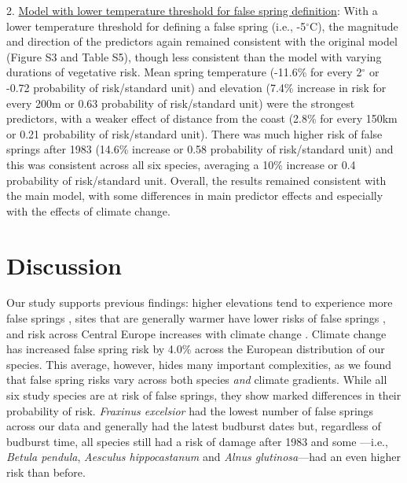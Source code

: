 \documentclass{article}\usepackage[]{graphicx}\usepackage[]{color}
\begin{document}
2. \underline{Model with lower temperature threshold for false spring definition}: With a lower temperature threshold for defining a false spring (i.e., -5$^{\circ}$C), the magnitude and direction of the predictors again remained consistent with the original model (Figure S3 and Table S5), though less consistent than the model with varying durations of vegetative risk. Mean spring temperature (-11.6\% for every 2$^\circ$ or -0.72 probability of risk/standard unit) and elevation (7.4\% increase in risk for every 200m or 0.63 probability of risk/standard unit) were the strongest predictors, with a weaker effect of distance from the coast (2.8\% for every 150km or 0.21 probability of risk/standard unit). There was much higher risk of false springs after 1983 (14.6\% increase or 0.58 probability of risk/standard unit) and this was consistent across all six species, averaging a 10\% increase or 0.4 probability of risk/standard unit. Overall, the results remained consistent with the main model, with some differences in main predictor effects and especially with the effects of climate change.

\section*{Discussion}
Our study supports previous findings: higher elevations tend to experience more false springs \citep{Vitasse2018, Vitra2017}, sites that are generally warmer have lower risks of false springs \citep{Wypych2016}, and risk across Central Europe increases with climate change \citep{Liu2018}. Climate change has increased false spring risk by 4.0\% across the European distribution of our species. This average, however, hides many important complexities, as we found that false spring risks vary across both species \textit{and} climate gradients. While all six study species are at risk of false springs, they show marked differences in their probability of risk. \textit{Fraxinus excelsior} had the lowest number of false springs across our data and generally had the latest budburst dates but, regardless of budburst time, all species still had a risk of damage after 1983 and some ---i.e., \textit{Betula pendula}, \textit{Aesculus hippocastanum} and \textit{Alnus glutinosa}---had an even higher risk than before.
\end{document}
